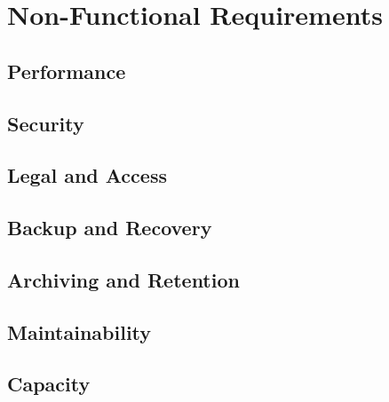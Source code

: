 \section{Non-Functional Requirements}


\subsection{Performance}

\subsection{Security}

\subsection{Legal and Access}

\subsection{Backup and Recovery}

\subsection{Archiving and Retention}

\subsection{Maintainability}

\subsection{Capacity}

